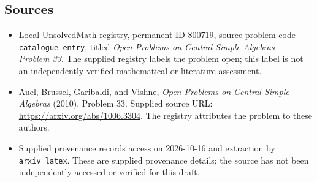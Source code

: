 \documentclass[11pt]{article}
\begin{document}
\subsection{Sources}
\begin{itemize}
\item Local UnsolvedMath registry, permanent ID \(800719\), source problem code \texttt{catalogue entry}, titled \emph{Open Problems on Central Simple Algebras --- Problem 33}. The supplied registry labels the problem open; this label is not an independently verified mathematical or literature assessment.
\item Auel, Brussel, Garibaldi, and Vishne, \emph{Open Problems on Central Simple Algebras} (2010), Problem 33. Supplied source URL: \url{https://arxiv.org/abs/1006.3304}. The registry attributes the problem to these authors.
\item Supplied provenance records access on 2026-10-16 and extraction by \texttt{arxiv\_latex}. These are supplied provenance details; the source has not been independently accessed or verified for this draft.
\end{itemize}
\end{document}
